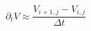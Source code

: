 \begin{equation}\label{partial_wrt_t}
	\partial_t V \approx \frac{V_{i+1,j} - V_{i,j}}{\Delta t}
\end{equation}